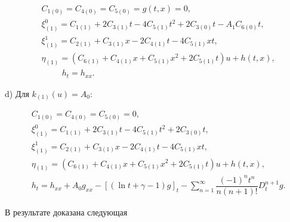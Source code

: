 \begin{align*}

& C_{1(0)}=C_{4(0)}=C_{5(0)}=g(t,x)=0, \\

& \xi^0_{(1)} = C_{1(1)}+2C_{3(1)}t-4C_{5(1)} t^2+2C_{3(0)}t-A_1 C_{6(0)}t, \\

& \xi^1_{(1)} = C_{2(1)}+C_{3(1)} x -2C_{4(1)} t-4C_{5(1)} xt, \\

& \eta_{(1)} = (C_{6(1)}+C_{4(1)} x +C_{5(1)} x^2 +2 C_{5(1)} t)u+h(t,x), \\

& \qquad \ \ h_t=h_{xx}.

\end{align*}



d) Для $k_{(1)}(u)=A_0$:

\begin{align*}

& C_{1(0)}=C_{4(0)}=C_{5(0)}=0, \\

& \xi^0_{(1)} = C_{1(1)}+2C_{3(1)}t-4C_{5(1)} t^2+2C_{3(0)}t, \\

& \xi^1_{(1)} = C_{2(1)}+C_{3(1)} x -2C_{4(1)} t-4C_{5(1)} xt, \\

& \eta_{(1)} = (C_{6(1)}+C_{4(1)} x +C_{5(1)} x^2 +2 C_{5(1)} t)u+h(t,x), \\

& h_t=h_{xx}+A_0g_{xx}-[(\ln t+\gamma-1)g]_t-\sum_{n=1}^{\infty} \dfrac{(-1)^n t^n}{n(n+1)!}D^{n+1}_t g.

\end{align*}






В результате доказана следующая



